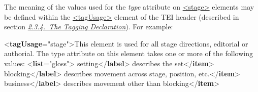 The meaning of the values used for the {\itshape type} attribute on \hyperref[TEI.stage]{<stage>} elements may be defined within the \hyperref[TEI.tagUsage]{<tagUsage>} element of the TEI header (described in section \textit{\hyperref[HD57]{2.3.4.\ The Tagging Declaration}}). For example: \par\bgroup{}\exampleFont \begin{shaded}\noindent\mbox{}{<\textbf{tagUsage}\hspace*{1em}{gi}="{stage}">}This element is used for all stage directions,\mbox{}\newline 
 editorial or authorial. The type attribute on this element takes\mbox{}\newline 
 one or more of the following values:\mbox{}\newline 
{<\textbf{list}\hspace*{1em}{type}="{gloss}">}\mbox{}\newline 
\hspace*{1em}setting{</\textbf{label}>}\mbox{}\newline 
\hspace*{1em}describes the set{</\textbf{item}>}\mbox{}\newline 
\hspace*{1em}blocking{</\textbf{label}>}\mbox{}\newline 
\hspace*{1em}describes movement across stage, position, etc.{</\textbf{item}>}\mbox{}\newline 
\hspace*{1em}business{</\textbf{label}>}\mbox{}\newline 
\hspace*{1em}describes movement other than blocking{</\textbf{item}>}\mbox{}\newline 

\end{shaded}
